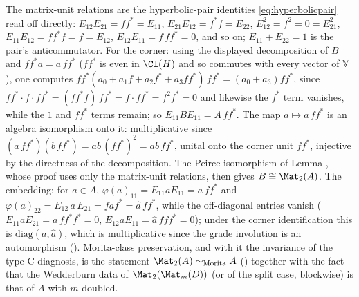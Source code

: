 The matrix-unit relations are the hyperbolic-pair identities \eqref{eq:hyperbolicpair} read off directly: $E_{12}E_{21} = ff^* = E_{11}$, $E_{21}E_{12} = f^*f = E_{22}$, $E_{12}^2 = f^2 = 0 = E_{21}^2$, $E_{11}E_{12} = ff^*f = f = E_{12}$, $E_{12}E_{11} = f\,ff^* = 0$, and so on; $E_{11} + E_{22} = 1$ is the pair's anticommutator. For the corner: using the displayed decomposition of $B$ and $ff^* a = a\, ff^*$ ($ff^*$ is even in $\Cl(H)$ and so commutes with every vector of $\mathbb{V}$), one computes $ff^* (a_0 + a_1 f + a_2 f^* + a_3 ff^*)\, ff^* = (a_0 + a_3) ff^*$, since $ff^* \cdot f \cdot ff^* = (ff^*f)\,ff^* = f \cdot ff^* = f^2 f^* = 0$ and likewise the $f^*$ term vanishes, while the $1$ and $ff^*$ terms remain; so $E_{11}BE_{11} = A\,ff^*$. The map $a \mapsto a\,ff^*$ is an algebra isomorphism onto it: multiplicative since $(a\,ff^*)(b\,ff^*) = ab\,(ff^*)^2 = ab\,ff^*$, unital onto the corner unit $ff^*$, injective by the directness of the decomposition. The Peirce isomorphism of Lemma , whose proof uses only the matrix-unit relations, then gives $B \cong \Mat_2(A)$. The embedding: for $a \in A$, $\varphi(a)_{11} = E_{11} a E_{11} = a\,ff^*$ and $\varphi(a)_{22} = E_{12}\, a\, E_{21} = f a f^* = \hat{a}\, ff^*$, while the off-diagonal entries vanish ($E_{11} a E_{21} = a\, ff^*f^* = 0$, $E_{12} a E_{11} = \hat a\,f ff^* = 0$); under the corner identification this is $\mathrm{diag}(a, \hat{a})$, which is multiplicative since the grade involution is an automorphism (). Morita-class preservation, and with it the invariance of the type-C diagnosis, is the statement $\Mat_2(A) \sim_{\text{Morita}} A$ () together with the fact that the Wedderburn data of $\Mat_2(\Mat_m(D))$ (or of the split case, blockwise) is that of $A$ with $m$ doubled.

